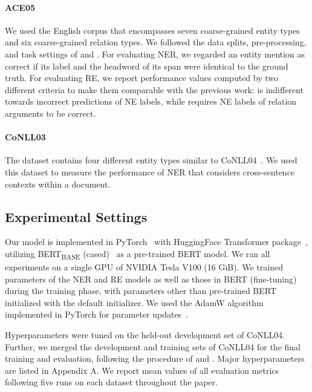 \documentclass[11pt,a4paper]{article}
\begin{document}
\paragraph{ACE05}  We used the English corpus that encompasses seven coarse-grained entity types and six coarse-grained relation types. We followed the data splits, pre-processing, and task settings of \citet{li-ji-2014-incremental} and \citet{miwa-bansal-2016-end}. For evaluating NER, we regarded an entity mention as correct if its label and the headword of its span were identical to the ground truth. For evaluating RE, we report performance values computed by two different criteria to make them comparable with the previous work:  is indifferent towards incorrect predictions of NE labels, while  requires NE labels of relation arguments to be correct.

\paragraph{CoNLL03} The dataset contains four different entity types similar to CoNLL04~\cite{roth-yih-2004-linear}. We used this dataset to measure the performance of NER that considers cross-sentence contexts within a document.


\subsection{Experimental Settings}

Our model is implemented in PyTorch~\cite{pytorch} with HuggingFace Transformer package~\cite{Wolf2019HuggingFacesTS}, utilizing BERT\textsubscript{BASE} (cased)~\cite{devlin-etal-2019-bert} as a pre-trained BERT model.
We ran all experiments on a single GPU of NVIDIA Tesla V100 (16 GiB).
We trained parameters of the NER and RE models as well as those in BERT (fine-tuning) during the training phase, with parameters other than pre-trained BERT initialized with the default initializer.
We used the AdamW algorithm implemented in PyTorch for parameter updates~\cite{loshchilov2018decoupled}.

Hyperparameters were tuned on the held-out development set of CoNLL04. Further, we merged the development and training sets of CoNLL04 for the final training and evaluation, following the procedure of \citet{gupta-etal-2016-table} and \citet{spert}. Major hyperparameters are listed in Appendix A. We report mean values of all evaluation metrics following five runs on each dataset throughout the paper.
\end{document}
